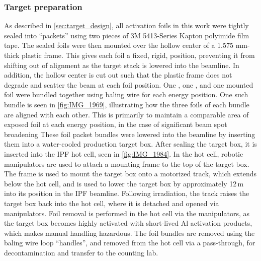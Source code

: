 \subsubsection{Target preparation}

As described in \autoref{sec:target_design}, all activation  foils in this work were   tightly sealed into \enquote{packets} using two pieces of  3M 5413-Series Kapton polyimide film tape.
The sealed foils were then mounted over the hollow center of a 1.575 mm-thick plastic frame.
This gives each foil a fixed, rigid, position, preventing it from shifting out of alignment as the target stack is lowered into the beamline.
In addition, the hollow center is cut out such that the plastic frame does not degrade and scatter the beam at each foil position.
One , one , and one  mounted foil were bundled together using baling wire for each energy position.
One such bundle is seen in \autoref{fig:IMG_1969}, illustrating how the three foils of each bundle are aligned with each other.
This is primarily to maintain a comparable area of exposed foil at each energy position, in the case of significant beam spot broadening
These foil packet bundles were lowered into the beamline by inserting them into a  water-cooled production target box.
After sealing the target box, it is inserted into the IPF hot cell, seen in \autoref{fig:IMG_1984}. 
In the hot cell, robotic manipulators are used to attach a mounting frame to the top of the target box.
The frame is used to mount the target box onto a motorized track, which extends  below the hot cell, and is used to lower the target box by approximately 12\,m into its position in the IPF beamline.
Following irradiation, the track raises the target box back into the hot cell, where it is detached and opened via manipulators.
Foil removal is performed in the hot cell via the manipulators, as the target box becomes highly activated with short-lived Al activation products, which makes manual handling hazardous.
The foil bundles are removed using the baling wire loop \enquote{handles}, and  removed from the hot cell via a pass-through, for decontamination and transfer to the counting lab.




